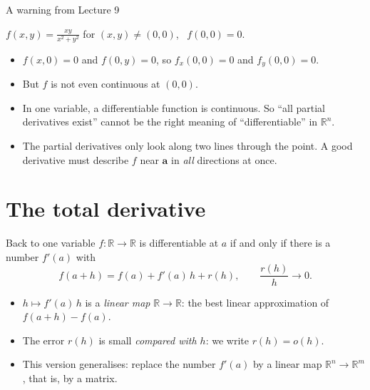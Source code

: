 \documentclass[10pt]{wosm-slides}
\newcommand{\R}{\mathbb{R}}
\newcommand{\va}{\mathbf{a}}
\begin{document}
\begin{frame}{A warning from Lecture 9}
  \begin{example}
    $f(x, y) = \frac{xy}{x^2 + y^2}$ for $(x, y) \ne (0, 0)$, \ $f(0, 0) = 0$.
    \begin{itemize}
      \item $f(x, 0) = 0$ and $f(0, y) = 0$, so $f_x(0, 0) = 0$ and $f_y(0, 0) = 0$.
      \item But $f$ is not even continuous at $(0, 0)$.
    \end{itemize}
  \end{example}
  \pause
  \begin{itemize}
    \item In one variable, a differentiable function is continuous. So ``all partial derivatives
      exist'' cannot be the right meaning of ``differentiable'' in $\R^n$.
    \item The partial derivatives only look along two lines through the point. A good
      derivative must describe $f$ near $\va$ in \emph{all} directions at once.
  \end{itemize}
\end{frame}

\section{The total derivative}

\begin{frame}{Back to one variable}
  $f\colon \R \to \R$ is differentiable at $a$ if and only if there is a number $f'(a)$ with
  \[ f(a + h) = f(a) + f'(a)\, h + r(h), \qquad \frac{r(h)}{h} \to 0 . \]
  \pause
  \begin{itemize}
    \item $h \mapsto f'(a)\, h$ is a \emph{linear map} $\R \to \R$: the best linear approximation of
      $f(a + h) - f(a)$.
    \item The error $r(h)$ is small \emph{compared with $h$}: we write $r(h) = o(h)$.
    \item This version generalises: replace the number $f'(a)$ by a linear map $\R^n \to \R^m$,
      that is, by a matrix.
  \end{itemize}
\end{frame}
\end{document}
